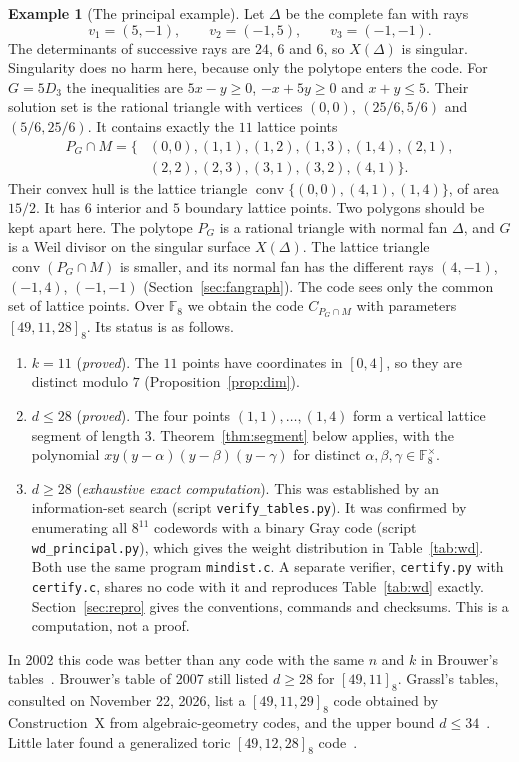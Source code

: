 \documentclass[12pt,letterpaper]{article}
\numberwithin{equation}{section}
\theoremstyle{definition}
\newtheorem{example}[theorem]{Example}
\theoremstyle{remark}
\DeclareMathOperator{\conv}{conv}
\newcommand{\F}{\mathbb{F}}
\newcommand{\st}[1]{\textup{(\emph{#1})}}
\begin{document}
\begin{example}[The principal example]\label{example:fan7}
Let $\Delta$ be the complete fan with rays
\[
v_1=(5,-1),\qquad v_2=(-1,5),\qquad v_3=(-1,-1).
\]
The determinants of successive rays are $24$, $6$ and $6$, so $X(\Delta)$ is
singular. Singularity does no harm here, because only the polytope enters the
code. For $G=5D_3$ the inequalities are $5x-y\ge0$, $-x+5y\ge0$ and $x+y\le5$.
Their solution set is the rational triangle with vertices $(0,0)$,
$(25/6,5/6)$ and $(5/6,25/6)$. It contains exactly the $11$ lattice points
\[
\begin{aligned}
P_G\cap M=\{&(0,0),(1,1),(1,2),(1,3),(1,4),(2,1),\\
&(2,2),(2,3),(3,1),(3,2),(4,1)\}.
\end{aligned}
\]
Their convex hull is the lattice triangle $\conv\{(0,0),(4,1),(1,4)\}$, of
area $15/2$. It has $6$ interior and $5$ boundary lattice points. Two polygons
should be kept apart here. The polytope $P_G$ is a rational triangle with
normal fan $\Delta$, and $G$ is a Weil divisor on the singular surface
$X(\Delta)$. The lattice triangle $\conv(P_G\cap M)$ is smaller, and its
normal fan has the different rays $(4,-1)$, $(-1,4)$, $(-1,-1)$
(Section~\ref{sec:fangraph}). The code sees only the common set of lattice
points. Over $\F_8$ we obtain the code $C_{P_G\cap M}$ with parameters $[49,11,28]_8$. Its status
is as follows.
\begin{enumerate}[leftmargin=*]
\item $k=11$ \st{proved}. The $11$ points have coordinates in $[0,4]$, so they
are distinct modulo $7$ (Proposition~\ref{prop:dim}).
\item $d\le28$ \st{proved}. The four points $(1,1),\dots,(1,4)$ form a
vertical lattice segment of length $3$. Theorem~\ref{thm:segment} below
applies, with the polynomial $xy(y-\alpha)(y-\beta)(y-\gamma)$ for distinct
$\alpha,\beta,\gamma\in\F_8^\times$.
\item $d\ge28$ \st{exhaustive exact computation}. This was established by an
information-set search (script \texttt{verify\_tables.py}). It was confirmed
by enumerating all $8^{11}$ codewords with a binary Gray code (script
\texttt{wd\_principal.py}), which gives the weight distribution in
Table~\ref{tab:wd}. Both use the same program \texttt{mindist.c}. A separate
verifier, \texttt{certify.py} with \texttt{certify.c}, shares no code with it
and reproduces Table~\ref{tab:wd} exactly. Section~\ref{sec:repro} gives the
conventions, commands and checksums. This is a computation, not a proof.
\end{enumerate}
In 2002 this code was better than any code with the same $n$ and $k$ in
Brouwer's tables~\cite{Br98}. Brouwer's table of 2007 still listed $d\ge28$
for $[49,11]_8$. Grassl's tables, consulted on November 22, 2026, list a
$[49,11,29]_8$ code obtained by Construction~X from algebraic-geometry codes,
and the upper bound $d\le34$~\cite{Gr26}. Little later found a generalized
toric $[49,12,28]_8$ code~\cite{Li11}.
\end{example}
\end{document}
